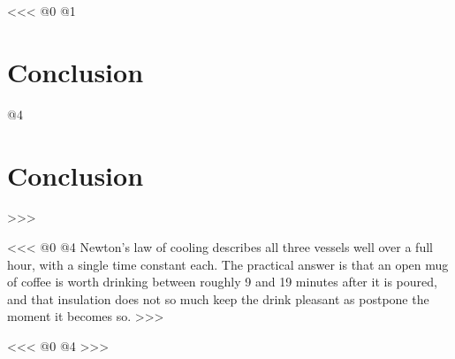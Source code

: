 <<<
@0
@1
\section{Conclusion}
@4
\section{Conclusion}\label{sec:conclusion}
>>>

<<<
@0
@4
Newton's law of cooling describes all three vessels well over a full hour,
with a single time constant each.
The practical answer is that an open mug of coffee is worth drinking between roughly 9 and 19 minutes after it is poured,
and that insulation does not so much keep the drink pleasant as postpone the moment it becomes so.
>>>


<<<
@0
@4
\printbibliography
>>>



